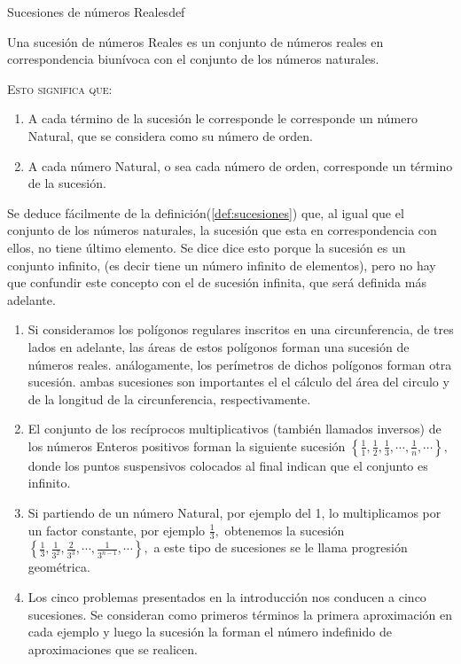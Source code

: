 \documentclass[oneside,english,spanish,2m,twoside,svgnames,x11names,HTML,twoside,12pt]{libro-matua}\usepackage[]{graphicx}\usepackage[]{color}
\newcommand{\noun}[1]{\textsc{#1}}
\begin{document}
\vspace*{10pt}\begin{defi}{Sucesiones de números Reales}{def}\label{def:sucesiones}

Una sucesión de números Reales es un conjunto de números reales en
correspondencia biunívoca con el conjunto de los números naturales.

\end{defi}

\noun{Esto significa que}:
\begin{enumerate}
\item A cada término de la sucesión le corresponde le corresponde un número
Natural, que se considera como su número de orden.
\item A cada número Natural, o sea cada número de orden, corresponde un
término de la sucesión.
\end{enumerate}
Se deduce fácilmente de la definición(\ref{def:sucesiones}) que,
al igual que el conjunto de los números naturales, la sucesión que
esta en correspondencia con ellos, no tiene último elemento. Se dice
dice esto porque la sucesión es un conjunto infinito, (es decir tiene
un número infinito de elementos), pero no hay que confundir este concepto
con el de sucesión infinita, que será definida más adelante.

\begin{ejemplos}
\begin{enumerate}
\item Si consideramos los polígonos regulares inscritos en una circunferencia,
de tres lados en adelante, las áreas de estos polígonos forman una
sucesión de números reales. análogamente, los perímetros de dichos
polígonos forman otra sucesión. ambas sucesiones son importantes el
el cálculo del área del circulo y de la longitud de la circunferencia,
respectivamente.
\item El conjunto de los recíprocos multiplicativos (también llamados inversos)
de los números Enteros positivos forman la siguiente sucesión $\left\{ \frac{1}{1},\frac{1}{2},\frac{1}{3},\cdots,\frac{1}{n},\cdots\right\} ,$
donde los puntos suspensivos colocados al final indican que el conjunto
es infinito.
\item Si partiendo de un número Natural, por ejemplo del 1, lo multiplicamos
por un factor constante, por ejemplo $\frac{1}{3},$ obtenemos la
sucesión $\left\{ \frac{1}{3},\frac{1}{3^{2}},\frac{2}{3^{3}},\cdots,\frac{1}{3^{n-1}},\cdots\right\} ,$
a este tipo de sucesiones se le llama progresión geométrica.
\item Los cinco problemas presentados en la introducción nos conducen a
cinco sucesiones. Se consideran como primeros términos la primera
aproximación en cada ejemplo y luego la sucesión la forman el número
indefinido de aproximaciones que se realicen.
\end{enumerate}
\end{ejemplos}
\end{document}
